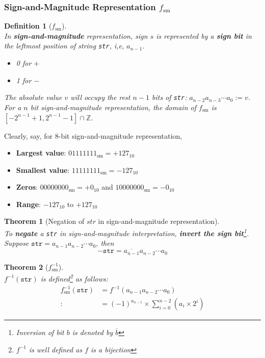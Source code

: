 \documentclass[12pt]{article}
\newtheorem{definition}{Definition}[section]
\newtheorem{theorem}{Theorem}[section]
\theoremstyle{definition}
\begin{document}
\subsubsection{Sign-and-Magnitude Representation $f_\text{sm}$}
\begin{definition}[$f_\text{sm}$]
\hfill\\\normalfont
  In \textbf{sign-and-magnitude} representation, sign $s$ is represented by a \textbf{sign bit} in the leftmost position of string \texttt{str}, i,e, $a_{n-1}$.
\begin{itemize}
  \item 0 for $+$
  \item 1 for $-$
\end{itemize}
The absolute value $v$ will occupy the rest $n-1$ bits of \texttt{str}: $a_{n-2}a_{n-3}\cdots a_0:=v$.\\
For a $n$ bit sign-and-magnitude representation, the domain of $f_\text{sm}$ is $[-2^{n-1}+1,2^{n-1}-1]\cap\mathbb{Z}$.
\end{definition}
Clearly, say, for 8-bit sign-and-magnitude representation,
\begin{itemize}
\item \textbf{Largest value}: $01111111_{\text{sm}}=+127_{10}$
\item \textbf{Smallest value}: $11111111_{\text{sm}}=-127_{10}$
\item \textbf{Zeros}: $00000000_{\text{sm}}= +0_{10}$ and $10000000_{\text{sm}}=-0_{10}$
\item \textbf{Range}: $-127_{10}$ to $+127_{10}$
\end{itemize}
\begin{theorem}[Negation of $str$ in sign-and-magnitude representation]
\hfill\\\normalfont To \textbf{negate} a \texttt{str} in sign-and-magnitude interpretation, \textbf{invert the sign bit}\footnote{Inversion of bit $b$ is denoted by $\overline{b}$}.
Suppose $\texttt{str} = a_{n-1}a_{n-2}\cdots a_0$, then
\[
-\texttt{str} = \overline{a_{n-1}}a_{n-2}\cdots a_0
\]
\end{theorem}
\begin{theorem}[$f^{-1}_\text{sm}$]
\hfill\\\normalfont $f^{-1}(\texttt{str})$ is defined\footnote{$f^{-1}$ is well defined as $f$ is a bijection} as follows:
\begin{align*}
f^{-1}_\text{sm}(\texttt{str})&=f^{-1}(a_{n-1}a_{n-2}\cdots a_0)\\
:&=(-1)^{a_{n-1}}\times\sum_{i=0}^{n-2}(a_i\times 2^i)
\end{align*}
\end{theorem}
\end{document}
